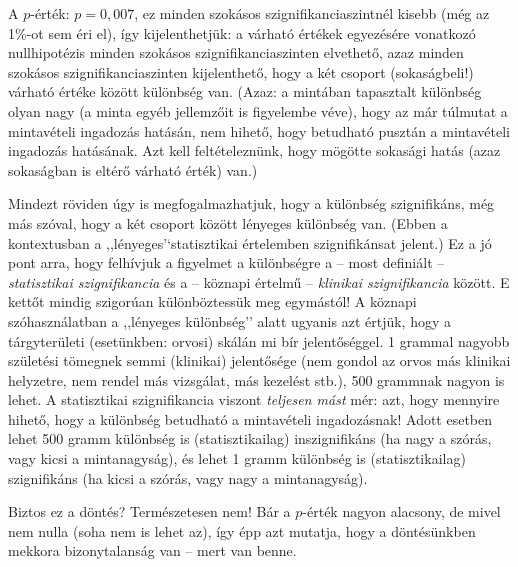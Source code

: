 \documentclass[]{book}
\begin{document}
A \(p\)-érték: \(p=0,\!007\), ez minden szokásos szignifikanciaszintnél
kisebb (még az 1\%-ot sem éri el), így kijelenthetjük: a várható értékek
egyezésére vonatkozó nullhipotézis minden szokásos szignifikanciaszinten
elvethető, azaz minden szokásos szignifikanciaszinten kijelenthető, hogy
a két csoport (sokaságbeli!) várható értéke között különbség van. (Azaz:
a mintában tapasztalt különbség olyan nagy (a minta egyéb jellemzőit is
figyelembe véve), hogy az már túlmutat a mintavételi ingadozás hatásán,
nem hihető, hogy betudható pusztán a mintavételi ingadozás hatásának.
Azt kell feltételeznünk, hogy mögötte sokasági hatás (azaz sokaságban is
eltérő várható érték) van.)

Mindezt röviden úgy is megfogalmazhatjuk, hogy a különbség szignifikáns,
még más szóval, hogy a két csoport között lényeges különbség van. (Ebben
a kontextusban a ,,lényeges'`statisztikai értelemben szignifikánsat
jelent.) Ez a jó pont arra, hogy felhívjuk a figyelmet a különbségre a
-- most definiált -- \emph{statisztikai szignifikancia} és a -- köznapi
értelmű -- \emph{klinikai szignifikancia} között. E kettőt mindig
szigorúan különböztessük meg egymástól! A köznapi szóhasználatban a
,,lényeges különbség'' alatt ugyanis azt értjük, hogy a tárgyterületi
(esetünkben: orvosi) skálán mi bír jelentőséggel. 1 grammal nagyobb
születési tömegnek semmi (klinikai) jelentősége (nem gondol az orvos más
klinikai helyzetre, nem rendel más vizsgálat, más kezelést stb.), 500
grammnak nagyon is lehet. A statisztikai szignifikancia viszont
\emph{teljesen mást} mér: azt, hogy mennyire hihető, hogy a különbség
betudható a mintavételi ingadozásnak! Adott esetben lehet 500 gramm
különbség is (statisztikailag) inszignifikáns (ha nagy a szórás, vagy
kicsi a mintanagyság), és lehet 1 gramm különbség is (statisztikailag)
szignifikáns (ha kicsi a szórás, vagy nagy a mintanagyság).

Biztos ez a döntés? Természetesen nem! Bár a \(p\)-érték nagyon
alacsony, de mivel nem nulla (soha nem is lehet az), így épp azt
mutatja, hogy a döntésünkben mekkora bizonytalanság van -- mert van
benne.
\end{document}

